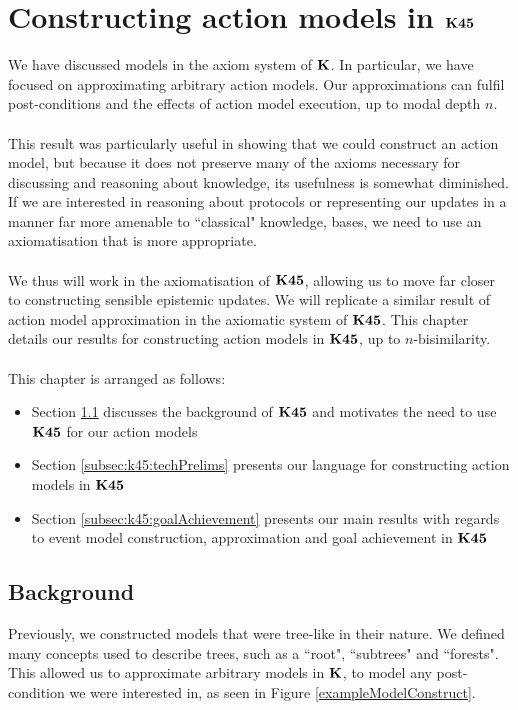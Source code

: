 \chapter{Constructing action models in $\bf K45$} \label{chapter:k45}

We have discussed models in the axiom system of $\bf K$.
In particular, we have focused on approximating arbitrary action models.
Our approximations can fulfil post-conditions and the effects of action model execution, up to modal
depth $n$.\\
\\
This result was particularly useful in showing that we could construct an action model, but because
it does not preserve many of the axioms necessary for discussing and reasoning about knowledge, its
usefulness is somewhat diminished.
If we are interested in reasoning about protocols or representing our updates in a manner far more
amenable to ``classical" knowledge, bases, we need to use an axiomatisation that is more
appropriate.\\
\\
We thus will work in the axiomatisation of $\bf K45$, allowing us to move far closer to constructing
sensible epistemic updates.
We will replicate a similar result of action model approximation in the axiomatic system
of $\bf K45$.
This chapter details our results for constructing action models in $\bf K45$, up to $n$-bisimilarity.\\
\\
This chapter is arranged as follows:
\begin{itemize}
	\item Section \ref{subsec:k45:background} discusses the background of $\bf K45$ and motivates the
		need to use $\bf K45$ for our action models
	\item Section \ref{subsec:k45:techPrelims} presents our language for constructing action models in
		$\bf K45$
	\item Section \ref{subsec:k45:goalAchievement} presents our main results with regards to event
		model construction, approximation and goal achievement in $\bf K45$
\end{itemize}

\section{Background} \label{subsec:k45:background}

Previously, we constructed models that were tree-like in their nature.
We defined many concepts used to describe trees, such as a ``root", ``subtrees" and ``forests".
This allowed us to approximate arbitrary models in $\bf K$, to model any post-condition we
were interested in, as seen in Figure \ref{exampleModelConstruct}.

